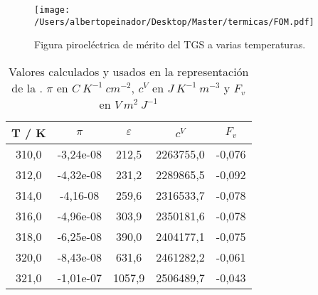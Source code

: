 \documentclass[a4paper, 12pt, spanish]{article}
\begin{document}
\begin{multicols}{2}
\begin{figure}[H]
    \centering
    \texttt{[image: /Users/albertopeinador/Desktop/Master/termicas/FOM.pdf]}
    \caption{Figura piroeléctrica de mérito del TGS a varias temperaturas.}\label{fig:FOM}
\end{figure}
\begin{table}[H]
    \centering
    \caption{Valores calculados y usados en la representación de la . $\pi$ en $C\ K^{-1}\ cm^{-2}$, $c^V$ en $J\ K^{-1}\ m^{-3}$ y $F_v$ en $V\ m^2\ J^{-1}$}\label{tab:FOM}
\begin{tabular}{ccccc}
    \toprule
       T / K &         $\pi$ &  $\varepsilon$ &      $c^V$ &     $F_v$ \\\midrule
  310,0 & -3,24e-08 &    212,5 &  2263755,0 & -0,076 \\
  312,0 & -4,32e-08 &    231,2 &  2289865,5 & -0,092 \\
  314,0 & -4,16-08 &    259,6 &  2316533,7 & -0,078 \\
  316,0 & -4,96e-08 &    303,9 &  2350181,6 & -0,078 \\
  318,0 & -6,25e-08 &    390,0 &  2404177,1 & -0,075 \\
  320,0 & -8,43e-08 &    631,6 &  2461282,2 & -0,061 \\
  321,0 & -1,01e-07 &   1057,9 &  2506489,7 & -0,043\\
    \bottomrule
    \end{tabular}
\end{table}



\end{multicols}
\end{document}
